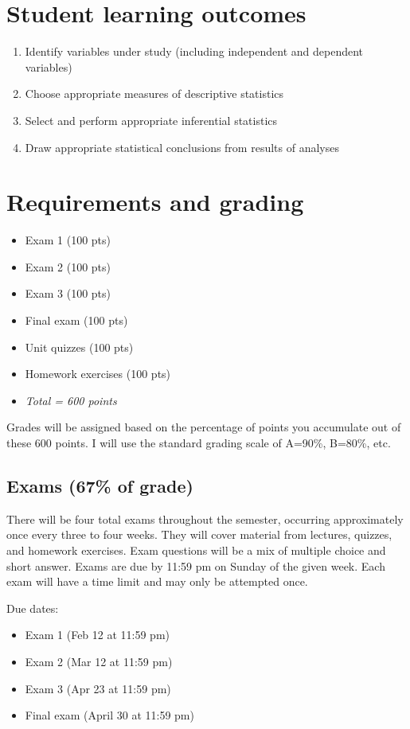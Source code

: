 \documentclass[10pt]{article}
\begin{document}
\section*{Student learning outcomes}
\label{sec-4}
\begin{enumerate}
\item Identify variables under study (including independent and dependent variables)
\item Choose appropriate measures of descriptive statistics
\item Select and perform appropriate inferential statistics
\item Draw appropriate statistical conclusions from results of analyses
\end{enumerate}

\section*{Requirements and grading}
\label{sec-5}
\begin{itemize}
\item Exam 1 (100 pts)
\item Exam 2 (100 pts)
\item Exam 3 (100 pts)
\item Final exam (100 pts)
\item Unit quizzes (100 pts)
\item Homework exercises (100 pts)
\item \emph{Total = 600 points}
\end{itemize}

Grades will be assigned based on the percentage of points you accumulate out of these 600 points.  I will use the standard grading scale of A=90\%, B=80\%, etc.

\subsection*{Exams (67\% of grade)}
\label{sec-5-1}
There will be four total exams throughout the semester, occurring 
approximately once every three to four weeks.  They will cover material 
from lectures, quizzes, and homework exercises.  Exam questions will be a mix of multiple choice and short answer.  Exams are due by 11:59 pm on 
Sunday of the given week.  Each exam will have a time limit and may only 
be attempted once.

Due dates:

\begin{itemize}
\item Exam 1 (Feb 12 at 11:59 pm)
\item Exam 2 (Mar 12 at 11:59 pm)
\item Exam 3 (Apr 23 at 11:59 pm)
\item Final exam (April 30 at 11:59 pm)
\end{itemize}
\end{document}
